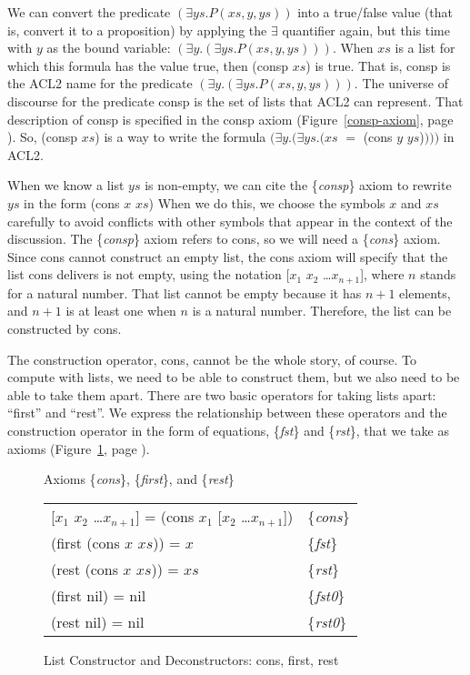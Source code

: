 We can convert the predicate $(\exists ys.P(xs, y, ys))$
into a true/false value (that is, convert it to a proposition)
by applying the $\exists$ quantifier again,
but this time with $y$ as the bound variable:
$(\exists y.(\exists ys.P(xs, y, ys)))$.
When $xs$ is a list for which this formula has the value true,
then (consp $xs$) is true.
That is, consp is the ACL2 name for the predicate $(\exists y.(\exists ys.P(xs, y, ys)))$.
The universe of discourse for the predicate consp is the set of lists that ACL2 can represent.
That description of consp is specified in the consp axiom
(Figure~\ref{consp-axiom}, page \pageref{consp-axiom}).
So, (consp $xs$) is a way to write the formula
$(\exists y.(\exists ys.(xs$ $=$ (cons $y$ $ys$)$)))$ in ACL2.

When we know a list $ys$ is non-empty,
we can cite the \{\emph{consp}\} axiom
to rewrite $ys$ in the form (cons $x$ $xs$)
When we do this, we choose the symbols $x$ and $xs$ carefully
to avoid conflicts with other symbols that appear in the context of the discussion.
The \{\emph{consp}\} axiom refers to cons, so we will need a \{\emph{cons}\} axiom.
Since cons cannot construct an empty list,
the cons axiom will specify that the list cons delivers is not empty,
using the notation [$x_1$ $x_2$ \dots $x_{n+1}$],
where $n$ stands for a natural number.
That list cannot be empty because it has $n+1$ elements, and $n+1$
is at least one when $n$ is a natural number.
Therefore, the list can be constructed by cons.

The construction operator, cons, cannot be the whole story, of course.
To compute with lists, we  need to be able to construct them,
but we also need to be able to take them apart.
There are two basic operators for taking lists apart: ``first'' and ``rest''.
We express the relationship between these operators and
the construction operator in the form of equations,
\{\emph{fst}\} and \{\emph{rst}\}, that we take as axioms
(Figure~\ref{first-rest-cons}, page \pageref{first-rest-cons}).

\begin{figure}
\begin{center}
 Axioms \{\emph{cons}\}, \{\emph{first}\}, and \{\emph{rest}\} \\
\begin{tabular}{ll}
 [$x_1$ $x_2$ \dots $x_{n+1}$] = (cons $x_1$ [$x_2$ \dots $x_{n+1}$]) & \{\emph{cons}\} \\
 (first (cons $x$ $xs$)) = $x$                                        & \{\emph{fst}\}\\
 (rest (cons $x$ $xs$))  = $xs$                                       & \{\emph{rst}\} \\
 (first nil) = nil                                                    & \{\emph{fst0}\}\\
 (rest nil) = nil                                                     & \{\emph{rst0}\}
\end{tabular}
\end{center}
\caption{List Constructor and Deconstructors: cons, first, rest}
\label{first-rest-cons}
\end{figure}

